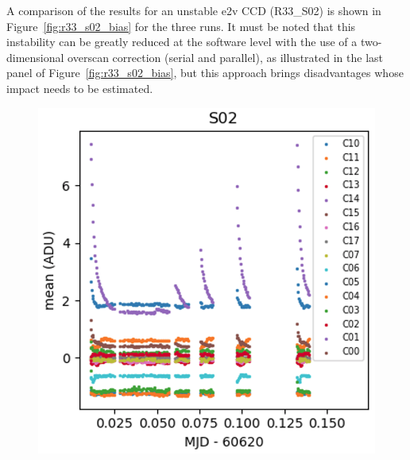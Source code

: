 A comparison of the results for an unstable e2v CCD (R33\_S02) is shown in Figure~\ref{fig:r33_s02_bias} for the
three runs. It must be noted that this instability can be greatly reduced at the software level with the use of a two-dimensional overscan correction (serial and parallel), as illustrated in
the last panel of Figure~\ref{fig:r33_s02_bias}, but this approach brings disadvantages whose impact needs to be estimated.

\begin{figure}[htbp]
\centering
\begin{minipage}[b]{0.45\textwidth}
    \centering
    \includegraphics[width=\textwidth]{figures/E2136_R33_S02.png}
\end{minipage}
\hspace{0.05\textwidth}
\begin{minipage}[b]{0.45\textwidth}
    \centering

\end{minipage}
\end{figure}
